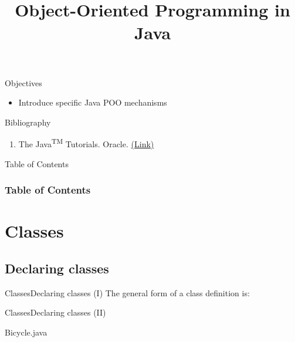 \documentclass[10pt,compress]{beamer} %
\title[OOP concepts]{Object-Oriented Programming in Java}
\author{}
\institute{\asignatura}
\date{}
\begin{document}
{\titlepageBlue
    \begin{frame}
        \titlepage
    \end{frame}
}

\begin{frame}[plain]{}
   \begin{block}{Objectives}
      \begin{itemize}
         \item Introduce specific Java POO mechanisms
      \end{itemize} 
   \end{block}

   \begin{block}{Bibliography}
      \begin{enumerate}
          \item The Java\textsuperscript{TM} Tutorials. Oracle. \href{https://docs.oracle.com/javase/tutorial/}{(Link)}
      \end{enumerate} 
   \end{block}
\end{frame}

{
\begin{frame}[shrink]{Table of Contents}
 \frametitle{Table of Contents}
 \tableofcontents
\end{frame}
}

\section{Classes}
\subsection{Declaring classes}

\begin{frame}{Classes}{Declaring classes (I)}
		The general form of a class definition is:
		\bigskip
		\vspace{-0.3cm}
			
\end{frame}

\begin{frame}[shrink]{Classes}{Declaring classes (II)}
		\vspace{-0.3cm}
		\begin{block}{Bicycle.java}
		\vspace{-0.3cm}
			
		\end{block}
\end{frame}
\end{document}

